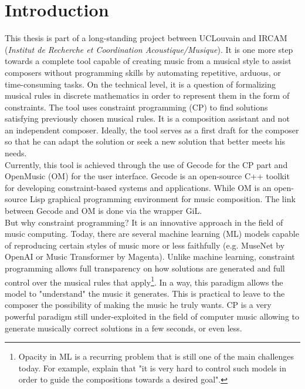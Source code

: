 \chapter*{Introduction} 
This thesis is part of a long-standing project between UCLouvain and IRCAM (\textit{Institut de Recherche et Coordination Acoustique/Musique})\parencite{IRCAM}. It is one more step towards a complete tool capable of creating music from a musical style to assist composers without programming skills by automating repetitive, arduous, or time-consuming tasks. On the technical level, it is a question of formalizing musical rules in discrete mathematics in order to represent them in the form of constraints. The tool uses constraint programming (CP) to find solutions satisfying previously chosen musical rules. It is a composition assistant and not an independent composer. Ideally, the tool serves as a first draft for the composer so that he can adapt the solution or seek a new solution that better meets his needs.\\

Currently, this tool is achieved through the use of Gecode\parencite{Gecode} for the CP part and OpenMusic\parencite{OpenMusic} (OM) for the user interface. Gecode is an open-source C++ toolkit for developing constraint-based systems and applications. While OM is an open-source Lisp graphical programming environment for music composition. The link between Gecode and OM is done via the wrapper GiL\parencite{GiL}.\\

But why constraint programming? It is an innovative approach in the field of music computing. Today, there are several machine learning (ML) models capable of reproducing certain styles of music more or less faithfully (e.g. MuseNet by OpenAI\parencite{MuseNet} or Music Transformer by Magenta\parencite{MusicTrans}). Unlike machine learning, constraint programming allows full transparency on how solutions are generated and full control over the musical rules that apply\footnote{Opacity in ML is a recurring problem that is still one of the main challenges today. For example, \textcite{ferreira2021learning} explain that "it is very hard to control such models in order to guide the compositions towards a desired goal".}. In a way, this paradigm allows the model to "understand" the music it generates. This is practical to leave to the composer the possibility of making the music he truly wants. CP is a very powerful paradigm still under-exploited in the field of computer music allowing to generate musically correct solutions in a few seconds, or even less.\\


